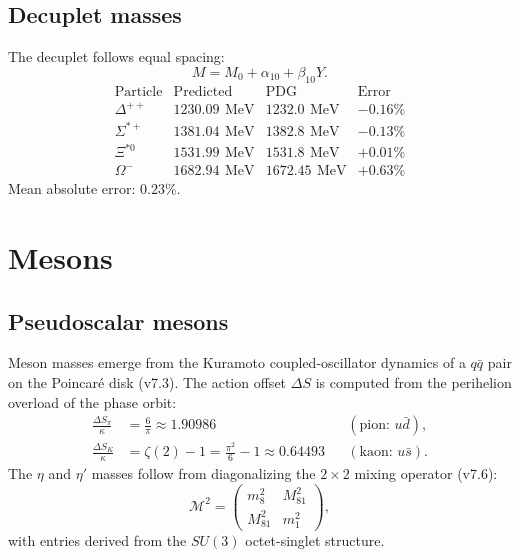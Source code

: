 \documentclass[aps,prd,reprint,twocolumn,showpacs,superscriptaddress]{revtex4-2}
\newcommand{\mev}{\,\text{MeV}}
\begin{document}
\subsection{Decuplet masses}

The decuplet follows equal spacing:
\begin{equation}
M = M_0 + \alpha_{10} + \beta_{10} Y.
\end{equation}
\[
\begin{array}{lccc}
\text{Particle} & \text{Predicted} & \text{PDG} & \text{Error} \\
\Delta^{++}     & 1230.09\ \mev  & 1232.0\ \mev  & -0.16\% \\
\Sigma^{*+}     & 1381.04\ \mev  & 1382.8\ \mev  & -0.13\% \\
\Xi^{*0}        & 1531.99\ \mev  & 1531.8\ \mev  & +0.01\% \\
\Omega^-        & 1682.94\ \mev  & 1672.45\ \mev & +0.63\%
\end{array}
\]
Mean absolute error: $0.23\%$.

\section{Mesons}
\label{sec:mesons}

\subsection{Pseudoscalar mesons}

Meson masses emerge from the Kuramoto coupled-oscillator dynamics of a
$q\bar{q}$ pair on the Poincar\'{e} disk (v7.3).  The action offset
$\Delta S$ is computed from the perihelion overload of the phase orbit:
\begin{align}
\frac{\Delta S_\pi}{\kappa} &= \frac{6}{\pi}
    \approx 1.90986
    &&(\text{pion: } u\bar{d}), \\
\frac{\Delta S_K}{\kappa} &= \zeta(2) - 1
    = \frac{\pi^2}{6} - 1
    \approx 0.64493
    &&(\text{kaon: } u\bar{s}).
\end{align}
The $\eta$ and $\eta'$ masses follow from diagonalizing the
$2 \times 2$ mixing operator (v7.6):
\begin{equation}
\mathcal{M}^2 =
\begin{pmatrix}
m_8^2 & M_{81}^2 \\
M_{81}^2 & m_1^2
\end{pmatrix},
\end{equation}
with entries derived from the $SU(3)$ octet-singlet structure.
\end{document}
